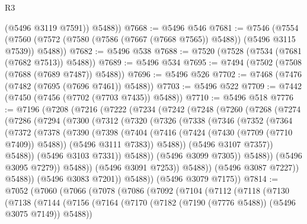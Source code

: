 \begin{lexlean}{R3}
\begin{coremodule}
          (@5496 @3119 @7591))
        @5488))
@7668 := @5496 @546
@7681 := @7546
    (@7554 (@7560 (@7572 (@7580 (@7586 (@7667 (@7668 @7565)) @5488)) (@5496 @3115 @7539)) @5488))
@7682 := @5496 @538
@7688 := @7520 (@7528 (@7534 (@7681 (@7682 @7513)) @5488))
@7689 := @5496 @534
@7695 := @7494 (@7502 (@7508 (@7688 (@7689 @7487)) @5488))
@7696 := @5496 @526
@7702 := @7468 (@7476 (@7482 (@7695 (@7696 @7461)) @5488))
@7703 := @5496 @522
@7709 := @7442 (@7450 (@7456 (@7702 (@7703 @7435)) @5488))
@7710 := @5496 @518
@7776 := @7196
    (@7208
      (@7216
        (@7222
          (@7234
            (@7242
              (@7248
                (@7260
                  (@7268
                    (@7274
                      (@7286
                        (@7294
                          (@7300
                            (@7312
                              (@7320
                                (@7326
                                  (@7338
                                    (@7346
                                      (@7352
                                        (@7364
                                          (@7372
                                            (@7378
                                              (@7390
                                                (@7398
                                                  (@7404
                                                    (@7416
                                                      (@7424 (@7430 (@7709 (@7710 @7409)) @5488))
                                                      (@5496 @3111 @7383))
                                                    @5488))
                                                (@5496 @3107 @7357))
                                              @5488))
                                          (@5496 @3103 @7331))
                                        @5488))
                                    (@5496 @3099 @7305))
                                  @5488))
                              (@5496 @3095 @7279))
                            @5488))
                        (@5496 @3091 @7253))
                      @5488))
                  (@5496 @3087 @7227))
                @5488))
            (@5496 @3083 @7201))
          @5488))
      (@5496 @3079 @7175))
@7814 := @7052
    (@7060
      (@7066
        (@7078
          (@7086
            (@7092
              (@7104
                (@7112
                  (@7118
                    (@7130
                      (@7138
                        (@7144
                          (@7156
                            (@7164 (@7170 (@7182 (@7190 (@7776 @5488)) (@5496 @3075 @7149)) @5488))

\end{coremodule}
\end{lexlean}
